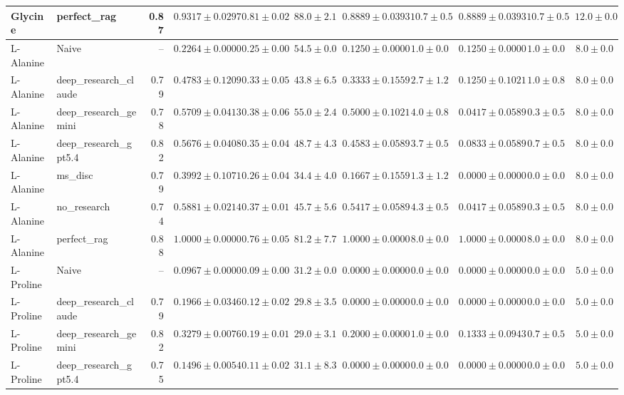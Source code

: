 \begin{table}[htbp]
\begin{tabular}{llrrrrrrrrr}
Glycine & perfect_rag & 0.87 & \cellcolor{green!25}$0.9317 \pm 0.0297$ & $0.81 \pm 0.02$ & $88.0 \pm 2.1$ & $0.8889 \pm 0.0393$ & $10.7 \pm 0.5$ & $0.8889 \pm 0.0393$ & $10.7 \pm 0.5$ & $12.0 \pm 0.0$ \\
\midrule
L-Alanine & Naive & -- & \cellcolor{red!25}$0.2264 \pm 0.0000$ & $0.25 \pm 0.00$ & $54.5 \pm 0.0$ & $0.1250 \pm 0.0000$ & $1.0 \pm 0.0$ & $0.1250 \pm 0.0000$ & $1.0 \pm 0.0$ & $8.0 \pm 0.0$ \\
L-Alanine & deep_research_claude & 0.79 & $0.4783 \pm 0.1209$ & $0.33 \pm 0.05$ & $43.8 \pm 6.5$ & $0.3333 \pm 0.1559$ & $2.7 \pm 1.2$ & $0.1250 \pm 0.1021$ & $1.0 \pm 0.8$ & $8.0 \pm 0.0$ \\
L-Alanine & deep_research_gemini & 0.78 & $0.5709 \pm 0.0413$ & $0.38 \pm 0.06$ & $55.0 \pm 2.4$ & $0.5000 \pm 0.1021$ & $4.0 \pm 0.8$ & $0.0417 \pm 0.0589$ & $0.3 \pm 0.5$ & $8.0 \pm 0.0$ \\
L-Alanine & deep_research_gpt5.4 & 0.82 & $0.5676 \pm 0.0408$ & $0.35 \pm 0.04$ & $48.7 \pm 4.3$ & $0.4583 \pm 0.0589$ & $3.7 \pm 0.5$ & $0.0833 \pm 0.0589$ & $0.7 \pm 0.5$ & $8.0 \pm 0.0$ \\
L-Alanine & ms_disc & 0.79 & $0.3992 \pm 0.1071$ & $0.26 \pm 0.04$ & $34.4 \pm 4.0$ & $0.1667 \pm 0.1559$ & $1.3 \pm 1.2$ & $0.0000 \pm 0.0000$ & $0.0 \pm 0.0$ & $8.0 \pm 0.0$ \\
L-Alanine & no_research & 0.74 & $0.5881 \pm 0.0214$ & $0.37 \pm 0.01$ & $45.7 \pm 5.6$ & $0.5417 \pm 0.0589$ & $4.3 \pm 0.5$ & $0.0417 \pm 0.0589$ & $0.3 \pm 0.5$ & $8.0 \pm 0.0$ \\
L-Alanine & perfect_rag & 0.88 & \cellcolor{green!25}$1.0000 \pm 0.0000$ & $0.76 \pm 0.05$ & $81.2 \pm 7.7$ & $1.0000 \pm 0.0000$ & $8.0 \pm 0.0$ & $1.0000 \pm 0.0000$ & $8.0 \pm 0.0$ & $8.0 \pm 0.0$ \\
\midrule
L-Proline & Naive & -- & $0.0967 \pm 0.0000$ & $0.09 \pm 0.00$ & $31.2 \pm 0.0$ & $0.0000 \pm 0.0000$ & $0.0 \pm 0.0$ & $0.0000 \pm 0.0000$ & $0.0 \pm 0.0$ & $5.0 \pm 0.0$ \\
L-Proline & deep_research_claude & 0.79 & $0.1966 \pm 0.0346$ & $0.12 \pm 0.02$ & $29.8 \pm 3.5$ & $0.0000 \pm 0.0000$ & $0.0 \pm 0.0$ & $0.0000 \pm 0.0000$ & $0.0 \pm 0.0$ & $5.0 \pm 0.0$ \\
L-Proline & deep_research_gemini & 0.82 & $0.3279 \pm 0.0076$ & $0.19 \pm 0.01$ & $29.0 \pm 3.1$ & $0.2000 \pm 0.0000$ & $1.0 \pm 0.0$ & $0.1333 \pm 0.0943$ & $0.7 \pm 0.5$ & $5.0 \pm 0.0$ \\
L-Proline & deep_research_gpt5.4 & 0.75 & $0.1496 \pm 0.0054$ & $0.11 \pm 0.02$ & $31.1 \pm 8.3$ & $0.0000 \pm 0.0000$ & $0.0 \pm 0.0$ & $0.0000 \pm 0.0000$ & $0.0 \pm 0.0$ & $5.0 \pm 0.0$ \\

\end{tabular}
\end{table}
